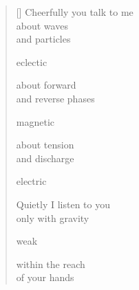 \documentclass[12pt,a4paper]{article}
\begin{document}
\thispagestyle{empty}

\poemtitle{}

\settowidth{\versewidth}{d'onde et de particules}

\bigskip

\begin{verse}[\versewidth]
  Cheerfully you talk to me \\
  about waves \\
  and particles

  eclectic

  about forward \\
  and reverse phases

  magnetic

  about tension \\
  and discharge

  electric

  Quietly I listen to you \\
  only with gravity

  weak

  within the reach \\
  of your hands
\end{verse}
\end{document}
